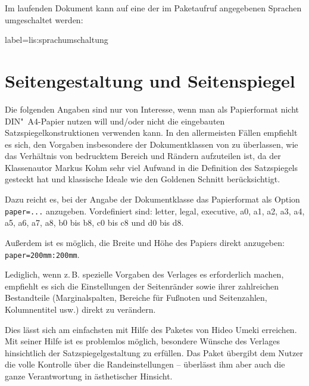 
Im laufenden Dokument kann auf eine der im Paketaufruf angegebenen Sprachen umgeschaltet werden:

\begin{lfgwcode}{label={lis:sprachumschaltung}}
\end{lfgwcode}


%


\section{Seitengestaltung und Seitenspiegel}
\label{komaskript}
 

Die folgenden Angaben sind nur von Interesse, wenn man als Papierformat nicht DIN"~A4-Papier 
nutzen will und/oder nicht die eingebauten Satzspiegelkonstruktionen verwenden kann.
In den allermeisten Fällen empfiehlt es sich, den Vorgaben insbesondere der Dokumentklassen von
\KOMAScript{} zu überlassen, wie das Verhältnis von bedrucktem Bereich und Rändern aufzuteilen ist,
da der Klassenautor Markus Kohm sehr viel Aufwand in die Definition des Satzspiegels gesteckt hat und
klassische Ideale wie den Goldenen Schnitt berücksichtigt.

Dazu reicht es, bei der Angabe der Dokumentklasse das Papierformat als Option \lstinline/paper=.../ anzugeben.
Vordefiniert sind: letter, legal, executive, a0, a1, a2, a3, a4, a5, a6, a7, a8, b0 bis b8, c0 bis c8 und
d0 bis d8. 

Außerdem ist es möglich, die Breite und Höhe des Papiers direkt anzugeben:
\lstinline/paper=200mm:200mm/.

Lediglich, wenn z.\,B. spezielle Vorgaben des Verlages es erforderlich machen, empfiehlt es sich
die Einstellungen der Seitenränder sowie ihrer zahlreichen Bestandteile (Marginalspalten, Bereiche
für Fußnoten und Seitenzahlen, Kolumnentitel usw.) direkt zu verändern.
 


Dies lässt sich am einfachsten mit Hilfe des Paketes  von Hideo Umeki erreichen.
Mit seiner Hilfe ist es problemlos möglich, besondere Wünsche des Verlages hinsichtlich der Satzspiegelgestaltung zu erfüllen. Das Paket übergibt dem Nutzer die volle Kontrolle über die
Randeinstellungen -- überlässt ihm aber auch die ganze Verantwortung in ästhetischer Hinsicht.

